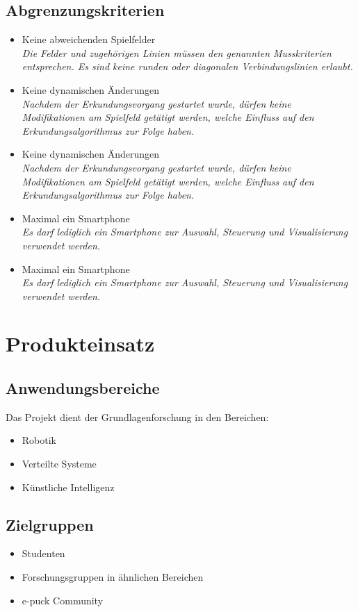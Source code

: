 \documentclass[10pt,a4paper]{article}
\begin{document}
		\subsection{Abgrenzungskriterien}
			\begin{itemize}
				\item Keine abweichenden Spielfelder
					\\ \textsl{Die Felder und zugehörigen Linien müssen den genannten Musskriterien entsprechen.
						Es sind keine runden oder diagonalen Verbindungslinien erlaubt.}
				\item Keine dynamischen Änderungen
					\\ \textsl{Nachdem der Erkundungsvorgang gestartet wurde, dürfen keine Modifikationen am
						Spielfeld getätigt werden, welche Einfluss auf den Erkundungsalgorithmus zur Folge haben.}
				\item Keine dynamischen Änderungen
					\\ \textsl{Nachdem der Erkundungsvorgang gestartet wurde, dürfen keine Modifikationen am
						Spielfeld getätigt werden, welche Einfluss auf den Erkundungsalgorithmus zur Folge haben.}
				\item Maximal ein Smartphone
					\\ \textsl{Es darf lediglich ein Smartphone zur Auswahl, Steuerung und Visualisierung verwendet
						werden.}					
				\item Maximal ein Smartphone
					\\ \textsl{Es darf lediglich ein Smartphone zur Auswahl, Steuerung und Visualisierung verwendet
						werden.}		
			\end{itemize}
	\section{Produkteinsatz}
		\subsection{Anwendungsbereiche}
			Das Projekt dient der Grundlagenforschung in den Bereichen:
			\begin{itemize}
				\item Robotik
				\item Verteilte Systeme
				\item Künstliche Intelligenz
			\end{itemize}
		\subsection{Zielgruppen}
			\begin{itemize}
				\item Studenten
				\item Forschungsgruppen in ähnlichen Bereichen
				\item e-puck Community
			\end{itemize}
\end{document}
